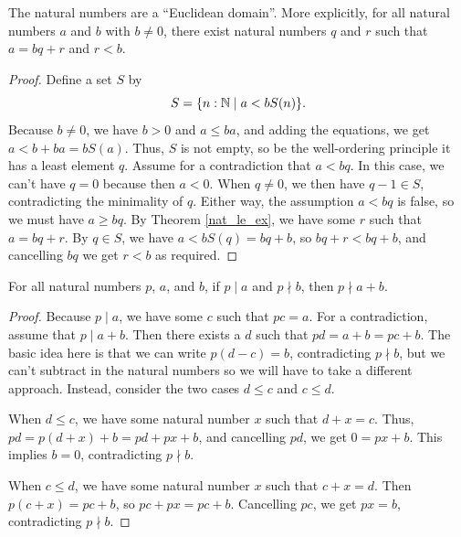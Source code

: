 \documentclass[../../math.tex]{subfiles}
\begin{document}
\begin{theorem} \label{nat_euclidean}
    The natural numbers are a ``Euclidean domain''.  More explicitly, for all
    natural numbers $a$ and $b$ with $b \neq 0$, there exist natural numbers $q$
    and $r$ such that $a = bq + r$ and $r < b$.
\end{theorem}
\begin{proof}
    Define a set $S$ by
    \[
        S = \{n : \mathbb{N} \mid a < b S(n)\}.
    \]
    Because $b \neq 0$, we have $b > 0$ and $a \leq ba$, and adding the
    equations, we get $a < b + ba = b S(a)$.  Thus, $S$ is not empty, so be the
    well-ordering principle it has a least element $q$.  Assume for a
    contradiction that $a < bq$.  In this case, we can't have $q = 0$ because
    then $a < 0$.  When $q \neq 0$, we then have $q - 1 \in S$, contradicting
    the minimality of $q$.  Either way, the assumption $a < bq$ is false, so we
    must have $a \geq bq$.  By Theorem \ref{nat_le_ex}, we have some $r$ such
    that $a = bq + r$.  By $q \in S$, we have $a < bS(q) = bq + b$, so $bq + r <
    bq + b$, and cancelling $bq$ we get $r < b$ as required.
\end{proof}

\begin{theorem} \label{nat_plus_changes_divides}
    For all natural numbers $p$, $a$, and $b$, if $p \mid a$ and $p \nmid b$,
    then $p \nmid a + b$.
\end{theorem}
\begin{proof}
    Because $p \mid a$, we have some $c$ such that $pc = a$.  For a
    contradiction, assume that $p \mid a + b$.  Then there exists a $d$ such
    that $pd = a + b = pc + b$.  The basic idea here is that we can write $p(d -
    c) = b$, contradicting $p \nmid b$, but we can't subtract in the natural
    numbers so we will have to take a different approach.  Instead, consider the
    two cases $d \leq c$ and $c \leq d$.

    When $d \leq c$, we have some natural number $x$ such that $d + x = c$.
    Thus, $pd = p(d + x) + b = pd + px + b$, and cancelling $pd$, we get $0 = px
    + b$.  This implies $b = 0$, contradicting $p \nmid b$.

    When $c \leq d$, we have some natural number $x$ such that $c + x = d$.
    Then $p(c + x) = pc + b$, so $pc + px = pc + b$.  Cancelling $pc$, we get
    $px = b$, contradicting $p \nmid b$.
\end{proof}
\end{document}
